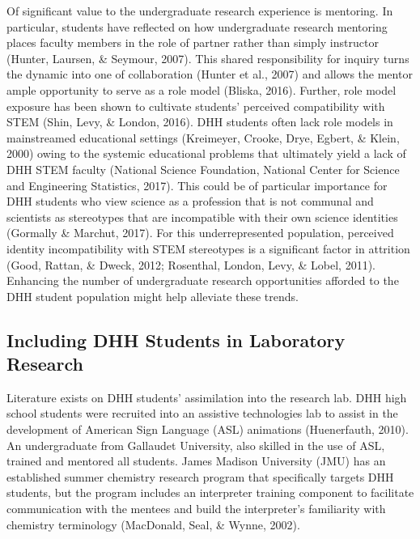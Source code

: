 \documentclass[11.5pt]{sig-alternate} %
\begin{document}
\begin{large}
Of significant value to the undergraduate research experience is mentoring. In particular, students have reflected on how undergraduate research mentoring places faculty members in the role of partner rather than simply instructor (Hunter, Laursen, \& Seymour, 2007). This shared responsibility for inquiry turns the dynamic into one of collaboration (Hunter et al., 2007) and allows the mentor ample opportunity to serve as a role model (Bliska, 2016). Further, role model exposure has been shown to cultivate students’ perceived compatibility with STEM (Shin, Levy, \& London, 2016). DHH students often lack role models in mainstreamed educational settings (Kreimeyer, Crooke, Drye, Egbert, \& Klein, 2000) owing to the systemic educational problems that ultimately yield a lack of DHH STEM faculty (National Science Foundation, National Center for Science and Engineering Statistics, 2017). This could be of particular importance for DHH students who view science as a profession that is not communal and scientists as stereotypes that are incompatible with their own science identities (Gormally \& Marchut, 2017). For this underrepresented population, perceived identity incompatibility with STEM stereotypes is a significant factor in attrition (Good, Rattan, \& Dweck, 2012; Rosenthal, London, Levy, \& Lobel, 2011). Enhancing the number of undergraduate research opportunities afforded to the DHH student population might help alleviate these trends.

\subsection*{Including DHH Students in Laboratory Research}

Literature exists on DHH students’ assimilation into the research lab. DHH high school students were recruited into an assistive technologies lab to assist in the development of American Sign Language (ASL) animations (Huenerfauth, 2010). An undergraduate from Gallaudet University, also skilled in the use of ASL, trained and mentored all students. James Madison University (JMU) has an established summer chemistry research program that specifically targets DHH students, but the program includes an interpreter training component to facilitate communication with the mentees and build the interpreter’s familiarity with chemistry terminology (MacDonald, Seal, \& Wynne, 2002). 


\end{large}
\end{document}
